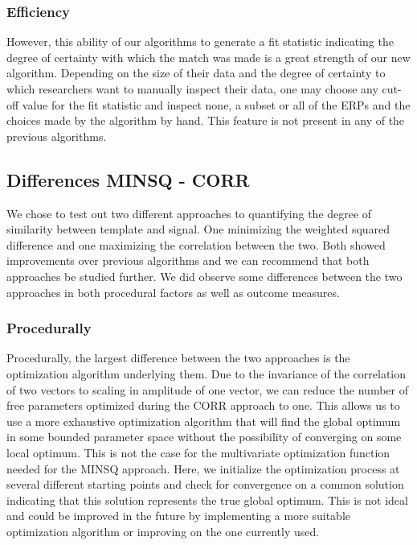 \documentclass[
  man,floatsintext]{apa7}
\begin{document}
\hypertarget{efficiency}{%
\subsubsection{Efficiency}\label{efficiency}}

However, this ability of our algorithms to generate a fit statistic indicating the degree of certainty with which the match was made is a great strength of our new algorithm. Depending on the size of their data and the degree of certainty to which researchers want to manually inspect their data, one may choose any cut-off value for the fit statistic and inspect none, a subset or all of the ERPs and the choices made by the algorithm by hand. This feature is not present in any of the previous algorithms.

\hypertarget{differences-minsq---corr}{%
\subsection{Differences MINSQ - CORR}\label{differences-minsq---corr}}

We chose to test out two different approaches to quantifying the degree of similarity between template and signal. One minimizing the weighted squared difference and one maximizing the correlation between the two. Both showed improvements over previous algorithms and we can recommend that both approaches be studied further. We did observe some differences between the two approaches in both procedural factors as well as outcome measures.

\hypertarget{procedurally}{%
\subsubsection{Procedurally}\label{procedurally}}

Procedurally, the largest difference between the two approaches is the optimization algorithm underlying them. Due to the invariance of the correlation of two vectors to scaling in amplitude of one vector, we can reduce the number of free parameters optimized during the CORR approach to one. This allows us to use a more exhaustive optimization algorithm that will find the global optimum in some bounded parameter space without the possibility of converging on some local optimum. This is not the case for the multivariate optimization function needed for the MINSQ approach. Here, we initialize the optimization process at several different starting points and check for convergence on a common solution indicating that this solution represents the true global optimum. This is not ideal and could be improved in the future by implementing a more suitable optimization algorithm or improving on the one currently used.
\end{document}
